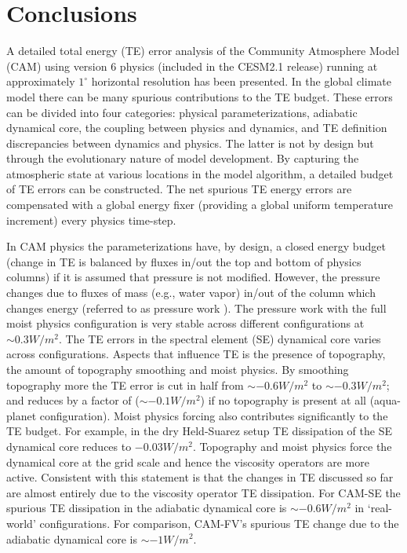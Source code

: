 \documentclass[draft,linenumbers]{agujournal}
\begin{document}
\section{Conclusions}\label{sec:concl}
A detailed total energy (TE) error analysis of the Community Atmosphere Model (CAM) using version 6 physics (included in the CESM2.1 release) running at approximately $1^\circ$ horizontal resolution has been presented. In the global climate model there can be many spurious contributions to the TE budget. These errors can be divided into four categories: physical parameterizations, adiabatic dynamical core, the coupling between physics and dynamics, and TE definition discrepancies between dynamics and physics. The latter is not by design but through the evolutionary nature of model development. By capturing the atmospheric state at various locations in the model algorithm, a detailed budget of TE errors can be constructed. The net spurious TE energy errors are compensated with a global energy fixer (providing a global uniform temperature increment) every physics time-step.

In CAM physics the parameterizations have, by design, a closed energy budget (change in TE is balanced by fluxes in/out the top and bottom of physics columns) if it is assumed that pressure is not modified. However, the pressure changes due to fluxes of mass (e.g., water vapor) in/out of the column which changes energy (referred to as pressure work {\color{red}{error}}). The pressure work {\color{red}{error}} with the full moist physics configuration is very stable across different configurations at $\sim 0.3W/m^2$. The TE errors in the spectral element (SE) dynamical core varies across configurations. Aspects that influence TE is the presence of topography, the amount of topography smoothing and moist physics. By smoothing topography more the TE error is cut in half from $\sim -0.6W/m^2$ to $\sim -0.3W/m^2$; and reduces by a factor of {\color{red}{six}} ($\sim-0.1W/m^2$) if no topography is present at all (aqua-planet configuration). Moist physics forcing also contributes significantly to the TE budget. For example, in the dry Held-Suarez setup TE dissipation of the SE dynamical core reduces to $-0.03W/m^2$. Topography and moist physics force the dynamical core at the grid scale and hence the viscosity operators are more active. Consistent with this statement is that the changes in TE discussed so far are almost entirely due to the viscosity operator TE dissipation. For CAM-SE the spurious TE dissipation in the adiabatic dynamical core is $\sim-0.6W/m^2$ in `real-world' configurations. For comparison, CAM-FV's spurious TE change due to the adiabatic dynamical core is $\sim-1W/m^2$. 
\end{document}
